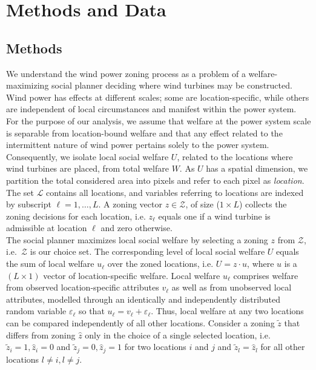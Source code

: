 \documentclass[review, a4paper, 12pt, authoryear, times]{elsarticle}
\begin{document}
\section{Methods and Data}
\subsection{Methods} \label{subsec:methods}
We understand the wind power zoning process as a problem of a welfare-maximizing social planner deciding where wind turbines may be constructed. Wind power has effects at different scales; some are location-specific, while others are independent of local circumstances and manifest within the power system.
For the purpose of our analysis, we assume that welfare at the power system scale is separable from location-bound welfare and that any effect related to the intermittent nature of wind power pertains solely to the power system. 
Consequently, we isolate local social welfare $U$, related to the locations where wind turbines are placed, from total welfare $W$.
As $U$ has a spatial dimension, we partition the total considered area into pixels and refer to each pixel as \emph{location}.
The set $\mathscr{L}$ contains all locations, and variables referring to locations are indexed by subscript $\ell = 1, \ldots, L$.
A zoning vector $z \in \mathscr{Z}$, of size ($1 \times L$) collects the zoning decisions for each location, i.e. $z_{\ell}$ equals one if a wind turbine is admissible at location $\ell$ and zero otherwise.\\
The social planner maximizes local social welfare by selecting a zoning $z$ from $\mathscr{Z}$, i.e.\ $\mathscr{Z}$ is our choice set.
The corresponding level of local social welfare $U$ equals the sum of local welfare $u_{\ell}$ over the zoned locations, i.e. $U = z \cdot u$, where $u$ is a $(L \times 1)$ vector of location-specific welfare.
Local welfare $u_{\ell}$ comprises welfare from observed location-specific attributes $v_{\ell}$ as well as from unobserved local attributes, modelled through an identically and independently distributed random variable $\varepsilon_{\ell}$ so that $u_{\ell} = v_{\ell} + \varepsilon_{\ell}$.
Thus, local welfare at any two locations can be compared independently of all other locations.
Consider a zoning $\widetilde{z}$ that differs from zoning $\hat{z}$ only in the choice of a single selected location, i.e. $\widetilde{z}_i = 1, \hat{z}_i = 0$ and $\widetilde{z}_j = 0, \hat{z}_j = 1$ for two locations $i$ and $j$  and $\widetilde{z}_l = \hat{z}_l$  for all other locations $l\neq i, l\neq j$.
\end{document}
